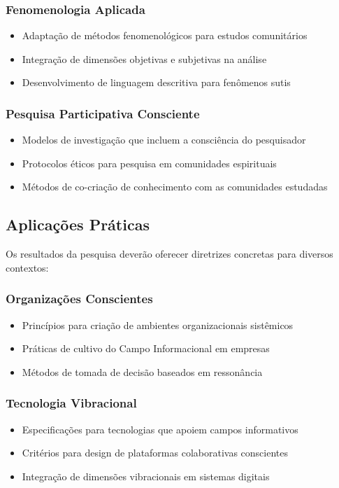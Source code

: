 \subsubsection{Fenomenologia Aplicada}
\begin{itemize}
    \item Adaptação de métodos fenomenológicos para estudos comunitários
    \item Integração de dimensões objetivas e subjetivas na análise
    \item Desenvolvimento de linguagem descritiva para fenômenos sutis
\end{itemize}

\subsubsection{Pesquisa Participativa Consciente}
\begin{itemize}
    \item Modelos de investigação que incluem a consciência do pesquisador
    \item Protocolos éticos para pesquisa em comunidades espirituais
    \item Métodos de co-criação de conhecimento com as comunidades estudadas
\end{itemize}

\subsection{Aplicações Práticas}

Os resultados da pesquisa deverão oferecer diretrizes concretas para diversos contextos:

\subsubsection{Organizações Conscientes}
\begin{itemize}
    \item Princípios para criação de ambientes organizacionais sistêmicos
    \item Práticas de cultivo do Campo Informacional em empresas
    \item Métodos de tomada de decisão baseados em ressonância
\end{itemize}

\subsubsection{Tecnologia Vibracional}
\begin{itemize}
    \item Especificações para tecnologias que apoiem campos informativos
    \item Critérios para design de plataformas colaborativas conscientes
    \item Integração de dimensões vibracionais em sistemas digitais
\end{itemize}

